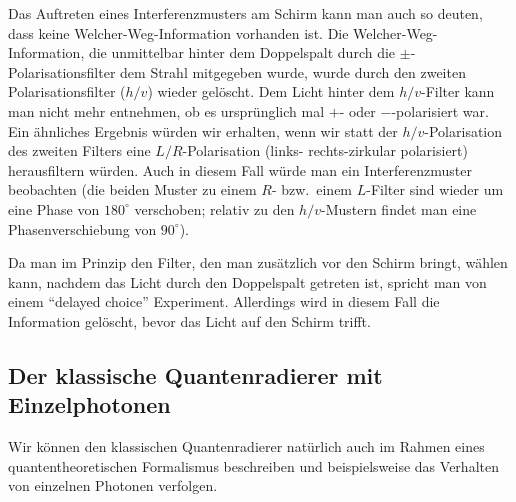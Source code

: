 Das Auftreten eines Interferenzmusters am Schirm kann man auch so deuten, dass keine
\glqq Welcher-Weg\grqq-Information vorhanden ist. Die \glqq Welcher-Weg\grqq-Information, die
unmittelbar hinter dem Doppelspalt durch die $\pm$-Polarisationsfilter dem Strahl mitgegeben
wurde, wurde durch den zweiten Polarisationsfilter ($h/v$) wieder gel\"oscht. Dem Licht hinter dem
$h/v$-Filter kann man nicht mehr entnehmen, ob es urspr\"unglich mal $+$- oder $-$-polarisiert war.
Ein \"ahnliches Ergebnis w\"urden wir erhalten, wenn wir statt der $h/v$-Polarisation des zweiten
Filters eine $L/R$-Polarisation (links- rechts-zirkular polarisiert) herausfiltern w\"urden. Auch in diesem
Fall w\"urde man ein Interferenzmuster beobachten (die beiden Muster zu einem $R$- bzw.\ einem 
$L$-Filter sind wieder um eine Phase von $180^\circ$ verschoben; relativ zu den $h/v$-Mustern findet
man eine Phasenverschiebung von $90^\circ$).

Da man im Prinzip den Filter, den man zus\"atzlich vor den Schirm bringt, w\"ahlen kann, nachdem
das Licht durch den Doppelspalt getreten ist, spricht man von einem ``delayed choice'' Experiment. 
Allerdings wird in diesem Fall die Information gel\"oscht, bevor das Licht auf den Schirm trifft. 

\subsection{Der klassische Quantenradierer mit Einzelphotonen}

Wir k\"onnen den klassischen Quantenradierer nat\"urlich auch im Rahmen eines
quantentheoretischen Formalismus beschreiben und beispielsweise das Verhalten von
einzelnen Photonen verfolgen. 

